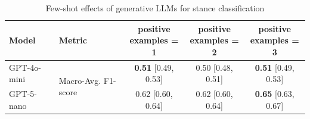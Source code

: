 \begin{table}[htbp]
\centering
\begin{tabular}{llccc}
\toprule
Model & Metric & \makecell{positive\\examples = 1} & \makecell{positive\\examples = 2} & \makecell{positive\\examples = 3} \\
\midrule
GPT-4o-mini & \multirow{2}{*}{Macro-Avg. F1-score} & \textbf{0.51} [0.49, 0.53] & 0.50 [0.48, 0.51] & \textbf{0.51} [0.49, 0.53] \\
GPT-5-nano &  & 0.62 [0.60, 0.64] & 0.62 [0.60, 0.64] & \textbf{0.65} [0.63, 0.67] \\
\bottomrule
\end{tabular}
\caption{Few-shot effects of generative LLMs for stance classification}
\label{tab:seqeval_dev_fs}
\end{table}